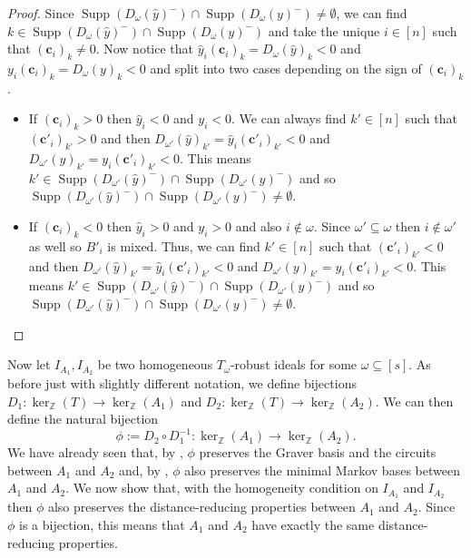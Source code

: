 \documentclass[a4paper, 12pt]{article}
\newcommand{\ZZ}{\mathbb Z}
\theoremstyle{plain}
\theoremstyle{definition}
\theoremstyle{remark}
\begin{document}
\begin{proof}
    Since $\operatorname{Supp}(D_{\omega}(\hat y)^-) \cap \operatorname{Supp}(D_{\omega}(y)^-) \neq \emptyset$, we can find $k \in \operatorname{Supp}(D_{\omega}(\hat y)^-) \cap \operatorname{Supp}(D_{\omega}(y)^-)$ and take the unique $i \in [n]$ such that $(\mathbf{c}_i)_k \neq 0$. Now notice that $\hat y_i (\mathbf{c}_i)_k=D_{\omega}(\hat y)_k<0$ and $ y_i (\mathbf{c}_i)_k=D_{\omega}(y)_k<0$ and split into two cases depending on the sign of $(\mathbf{c}_i)_k$.
    \begin{itemize}
        \item If $(\mathbf{c}_i)_k>0$ then $\hat y_i<0$ and $y_i<0$. We can always find $k' \in [n]$ such that $(\mathbf{c}'_i)_{k'}>0$ and then $D_{\omega'}(\hat y)_{k'}=\hat y_i (\mathbf{c}'_i)_{k'}<0$ and $D_{\omega'}(y)_{k'}=y_i (\mathbf{c}'_i)_{k'}<0$. This means $k' \in \operatorname{Supp}(D_{\omega'}(\hat y)^-) \cap \operatorname{Supp}(D_{\omega'}(y)^-) $ and so $\operatorname{Supp}(D_{\omega'}(\hat y)^-) \cap \operatorname{Supp}(D_{\omega'}(y)^-) \neq \emptyset$.
        \item If $(\mathbf{c}_i)_k<0$ then $\hat y_i>0$ and $y_i>0$ and also $i \not\in \omega$. Since $\omega' \subseteq \omega$ then $i \not\in \omega'$ as well so $B'_i$ is mixed. Thus, we can find $k' \in [n]$ such that $(\mathbf{c}'_i)_{k'}<0$ and then $D_{\omega'}(\hat y)_{k'}=\hat y_i (\mathbf{c}'_i)_{k'}<0$ and $D_{\omega'}(y)_{k'}=y_i (\mathbf{c}'_i)_{k'}<0$. This means $k' \in \operatorname{Supp}(D_{\omega'}(\hat y)^-) \cap \operatorname{Supp}(D_{\omega'}(y)^-) $ and so $\operatorname{Supp}(D_{\omega'}(\hat y)^-) \cap \operatorname{Supp}(D_{\omega'}(y)^-) \neq \emptyset$.
    \end{itemize}
\end{proof}


Now let $I_{A_1},I_{A_2}$ be two homogeneous $T_{\omega}$-robust ideals for some $\omega \subseteq [s]$. As before just with slightly different notation, we define bijections $D_1:\ker_\ZZ(T) \rightarrow \ker_\ZZ(A_1)$ and $D_2:\ker_\ZZ(T) \rightarrow \ker_\ZZ(A_2)$. We can then define the natural bijection 
$$\phi:=D_2 \circ D_1^{-1}:\ker_\ZZ(A_1) \rightarrow \ker_\ZZ(A_2).$$
We have already seen that, by \cite[Theorem 1.11]{petrovic2018bouquet}, $\phi$ preserves the Graver basis and the circuits between $A_1$ and $A_2$ and, by \cite[Theorem 2.2]{kosta2023strongly}, $\phi$ also preserves the minimal Markov bases between $A_1$ and $A_2$. We now show that, with the homogeneity condition on $I_{A_1}$ and $I_{A_2}$ then $\phi$ also preserves the distance-reducing properties between $A_1$ and $A_2$. Since $\phi$ is a bijection, this means that $A_1$ and $A_2$ have exactly the same distance-reducing properties.
\end{document}
